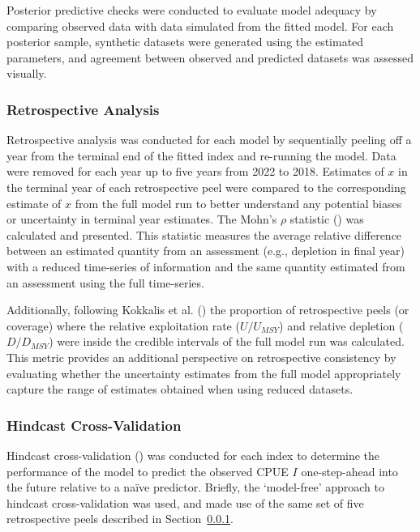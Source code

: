\documentclass[
  11pt,
]{SCreport}
\begin{document}
Posterior predictive checks were conducted to evaluate model adequacy by
comparing observed data with data simulated from the fitted model. For
each posterior sample, synthetic datasets were generated using the
estimated parameters, and agreement between observed and predicted
datasets was assessed visually.

\subsubsection{Retrospective Analysis}\label{sec-retrospective-analysis}

Retrospective analysis was conducted for each model by sequentially
peeling off a year from the terminal end of the fitted index and
re-running the model. Data were removed for each year up to five years
from 2022 to 2018. Estimates of \(x\) in the terminal year of each
retrospective peel were compared to the corresponding estimate of \(x\)
from the full model run to better understand any potential biases or
uncertainty in terminal year estimates. The Mohn's \(\rho\) statistic
() was calculated and
presented. This statistic measures the average relative difference
between an estimated quantity from an assessment (e.g., depletion in
final year) with a reduced time-series of information and the same
quantity estimated from an assessment using the full time-series.

Additionally, following Kokkalis et al.
() the proportion of
retrospective peels (or coverage) where the relative exploitation rate
(\(U/U_{MSY}\)) and relative depletion (\(D/D_{MSY}\)) were inside the
credible intervals of the full model run was calculated. This metric
provides an additional perspective on retrospective consistency by
evaluating whether the uncertainty estimates from the full model
appropriately capture the range of estimates obtained when using reduced
datasets.

\subsubsection{Hindcast
Cross-Validation}\label{sec-hindcast-cross-validation}

Hindcast cross-validation () was conducted for each index to determine the performance of
the model to predict the observed CPUE \(I\) one-step-ahead into the
future relative to a naïve predictor. Briefly, the `model-free' approach
to hindcast cross-validation was used, and made use of the same set of
five retrospective peels described in
Section~\ref{sec-retrospective-analysis}.
\end{document}
